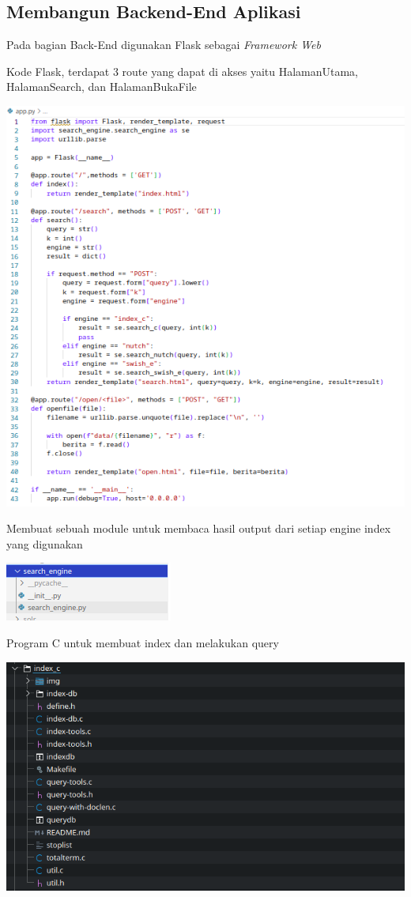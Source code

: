 \documentclass[12pt]{article}
\begin{document}
    \justifying
    \subsection*{Membangun Backend-End Aplikasi}
    Pada bagian Back-End digunakan Flask sebagai \textit{Framework Web}

    Kode Flask, terdapat 3 route yang dapat di akses yaitu HalamanUtama, HalamanSearch, dan HalamanBukaFile

    \includegraphics[scale=0.8]{images/appcode.png}

    Membuat sebuah module untuk membaca hasil output dari setiap engine index yang digunakan

    \includegraphics[scale=2.7]{images/module-se.png}

    Program C untuk membuat index dan melakukan query

    \includegraphics[scale=0.8]{images/c.png}
    
\end{document}
